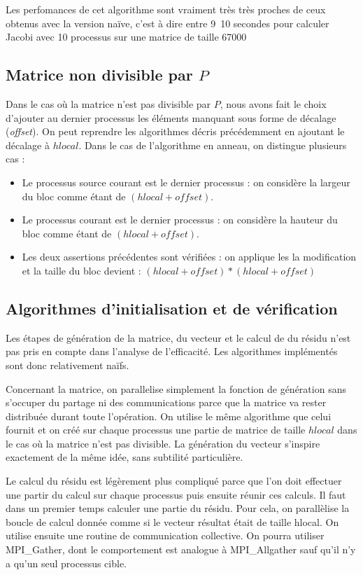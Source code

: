 \documentclass[a4paper]{article}
\begin{document}
Les perfomances de cet algorithme sont vraiment très très proches de
ceux obtenus avec la version naïve, c'est à dire entre 9~10 secondes
pour calculer Jacobi avec 10 processus sur une matrice de taille 67000


\subsection{Matrice non divisible par $P$}

Dans le cas où la matrice n'est pas divisible par $P$, nous avons fait
le choix d'ajouter au dernier processus les éléments manquant sous
forme de décalage (\emph{offset}). On peut reprendre les algorithmes
décris précédemment en ajoutant le décalage à $hlocal$. Dans le cas de
l'algorithme en anneau, on distingue plusieurs cas :
\begin{itemize}
\item Le processus source courant est le dernier processus : on
considère la largeur du bloc comme étant de $(hlocal + offset)$.
\item Le processus courant est le dernier processus : on considère la
hauteur du bloc comme étant de $(hlocal + offset)$.
\item Les deux assertions précédentes sont vérifiées : on applique les
la modification et la taille du bloc devient : $(hlocal + offset) *
(hlocal + offset)$
\end{itemize}

\subsection{Algorithmes d'initialisation et de vérification}

Les étapes de génération de la matrice, du vecteur et le calcul de du
résidu n'est pas pris en compte dans l'analyse de l'efficacité. Les
algorithmes implémentés sont donc relativement naïfs.

Concernant la matrice, on parallelise simplement la fonction de
génération sans s'occuper du partage ni des communications parce que
la matrice va rester distribuée durant toute l'opération. On utilise
le même algorithme que celui fournit et on créé sur chaque processus
une partie de matrice de taille $hlocal$ dans le cas où la
matrice n'est pas divisible. La génération du vecteur s'inspire
exactement de la même idée, sans subtilité particulière.

Le calcul du résidu est légèrement plus compliqué parce que l'on doit
effectuer une partir du calcul sur chaque processus puis ensuite
réunir ces calculs. Il faut dans un premier temps calculer une partie
du résidu. Pour cela, on parallèlise la boucle de calcul donnée comme
si le vecteur résultat était de taille hlocal. On utilise ensuite une
routine de communication collective. On pourra utiliser MPI\_Gather,
dont le comportement est analogue à MPI\_Allgather sauf qu'il n'y a
qu'un seul processus cible.
\end{document}
